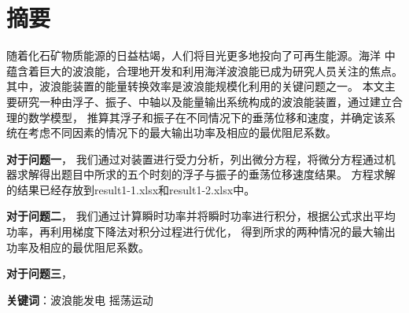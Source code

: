 \section*{摘要}
随着化石矿物质能源的日益枯竭，人们将目光更多地投向了可再生能源。海洋
中蕴含着巨大的波浪能，合理地开发和利用海洋波浪能已成为研究人员关注的焦点。其中，波浪能装置的能量转换效率是波浪能规模化利用的关键问题之一。
本文主要研究一种由浮子、振子、中轴以及能量输出系统构成的波浪能装置，通过建立合理的数学模型，
推算其浮子和振子在不同情况下的垂荡位移和速度，并确定该系统在考虑不同因素的情况下的最大输出功率及相应的最优阻尼系数。

\textbf{对于问题一}，
我们通过对装置进行受力分析，列出微分方程，将微分方程通过机器求解得出题目中所求的五个时刻的浮子与振子的垂荡位移速度结果。
方程求解的结果已经存放到result1-1.xlsx和result1-2.xlsx中。


\textbf{对于问题二}，
我们通过计算瞬时功率并将瞬时功率进行积分，根据公式求出平均功率，再利用梯度下降法对积分过程进行优化，
得到所求的两种情况的最大输出功率及相应的最优阻尼系数。

\textbf{对于问题三}，


\textbf{关键词}：波浪能发电 \hspace{1em} 摇荡运动 \hspace{1em}